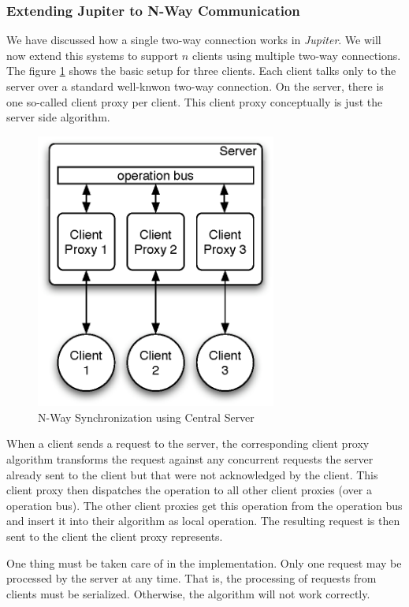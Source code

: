 \subsubsection{Extending Jupiter to N-Way Communication}
We have discussed how a single two-way connection works in \emph{Jupiter}. We will now extend this systems to support $n$ clients using multiple two-way connections. The figure \ref{fig:concepts.nway-details} shows the basic setup for three clients. Each client talks only to the server over a standard well-knwon two-way connection. On the server, there is one so-called client proxy per client. This client proxy conceptually is just the server side algorithm. 

\begin{figure}[htb]
 \centering
 \includegraphics[width=7.9cm,height=9.06cm]{../../images/concepts_nway-details.eps}
 \caption{N-Way Synchronization using Central Server}
 \label{fig:concepts.nway-details}
\end{figure}

When a client sends a request to the server, the corresponding client proxy algorithm transforms the request against any concurrent requests the server already sent to the client but that were not acknowledged by the client. This client proxy then dispatches the operation to all other client proxies (over a operation bus). The other client proxies get this operation from the operation bus and insert it into their algorithm as local operation. The resulting request is then sent to the client the client proxy represents. 

One thing must be taken care of in the implementation. Only one request may be processed by the server at any time. That is, the processing of requests from clients must be serialized. Otherwise, the algorithm will not work correctly.

